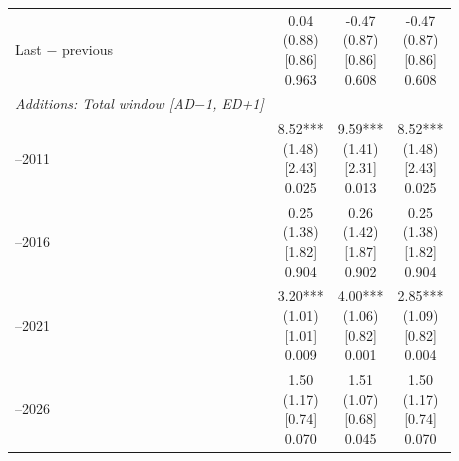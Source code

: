 \begin{threeparttable}
\begin{tabular}{@{}lccc}
\addlinespace[0.25ex]
\addlinespace[0.25ex]
Last $-$ previous & \makecell{0.04\\(0.88)\\{}[0.86]\\{0.963}} & \makecell{-0.47\\(0.87)\\{}[0.86]\\{0.608}} & \makecell{-0.47\\(0.87)\\{}[0.86]\\{0.608}} \\
\addlinespace[0.25ex]
\midrule
\emph{Additions: Total window [AD$-$1, ED+1]} \\
\addlinespace[0.25ex]
\addlinespace[1ex]
2007–2011 & \makecell{8.52***\\(1.48)\\{}[2.43]\\{0.025}} & \makecell{9.59***\\(1.41)\\{}[2.31]\\{0.013}} & \makecell{8.52***\\(1.48)\\{}[2.43]\\{0.025}} \\
\addlinespace[0.25ex]
\addlinespace[0.25ex]
2012–2016 & \makecell{0.25\\(1.38)\\{}[1.82]\\{0.904}} & \makecell{0.26\\(1.42)\\{}[1.87]\\{0.902}} & \makecell{0.25\\(1.38)\\{}[1.82]\\{0.904}} \\
\addlinespace[0.25ex]
\addlinespace[0.25ex]
2017–2021 & \makecell{3.20***\\(1.01)\\{}[1.01]\\{0.009}} & \makecell{4.00***\\(1.06)\\{}[0.82]\\{0.001}} & \makecell{2.85***\\(1.09)\\{}[0.82]\\{0.004}} \\
\addlinespace[0.25ex]
\addlinespace[0.25ex]
2022–2026 & \makecell{1.50\\(1.17)\\{}[0.74]\\{0.070}} & \makecell{1.51\\(1.07)\\{}[0.68]\\{0.045}} & \makecell{1.50\\(1.17)\\{}[0.74]\\{0.070}} \\

\end{tabular}
\end{threeparttable}
